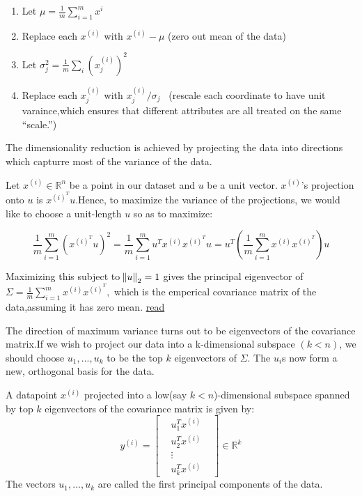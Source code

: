 \documentclass[12pt]{article}
\begin{document}
\begin{enumerate}
	\item Let $\mu  = \frac{1}{m} \sum_{i=1}^{m}x^{i}$
	\item Replace each $x^{(i)}$ with $x^{(i)}-\mu$ (zero out mean of the data)
	\item Let $\sigma _{j}^{2} = \frac{1}{m} \sum_{i}(x_{j}^{(i)})^{2}$
	\item  Replace each $x_{j}^{(i)}$ with $x_{j}^{(i)} /  \sigma_{j}$ \ (rescale each coordinate to have unit varaince,which ensures that different attributes are all treated on the same
	“scale.”)
\end{enumerate}

The dimensionality reduction is achieved by projecting the data into directions which capturre most of the variance of the data.

Let $x^{(i)} \in \mathbb{R}^{n}$ be a point in our dataset and $u$ be a unit vector. $x^{(i)}$'s projection onto $u$ is $x^{(i)^T}u$.Hence, to maximize the variance of the projections, we would like to choose a unit-length $u$ so as to maximize:
 
 $$\frac{1}{m} \sum_{i=1}^{m}(x^{(i)^T}u)^{2} = \frac{1}{m} \sum_{i=1}^{m} u^{T}x^{(i)}x^{(i)^T}u = u^{T} \left(\frac{1}{m} \sum_{i=1}^{m} x^{(i)}x^{(i)^T} \right)u$$
 
 Maximizing this subject to  $\norm{u}_{2}=1$ gives the principal eigenvector of $\Sigma = \frac{1}{m} \sum_{i=1}^{m} x^{(i)}x^{(i)^T} ,$ which is the emperical covariance matrix of the data,assuming it has zero mean. \href{https://math.stackexchange.com/questions/1199852/maximize-the-value-of-vtav}{read}
 
 The direction of maximum variance turns out to be eigenvectors of the covariance matrix.If we wish to project our data into a k-dimensional subspace $(k < n)$, we should choose $u_{1}, ..., u_{k}$ to be the top $k$ eigenvectors of $\Sigma$. The $u_{i}$s now form a new, orthogonal basis for the data.
 
 A datapoint $x^{(i)}$ projected into a low(say $k<n$)-dimensional subspace  spanned by top $k$ eigenvectors of the covariance matrix is given by:
 $$y^{(i)} =\begin{bmatrix} 
 	& u_{1}^{T}x^{(i)} &  \\
 	& u_{2}^{T}x^{(i)} &\\
 	& \vdots & \\
 	& u_{k}^{T}x^{(i)} &
 \end{bmatrix}  \in \mathbb{R}^{k}$$
 The vectors  $u_{1}, ..., u_{k}$ are called the first principal components of the data.
 
\end{document}
